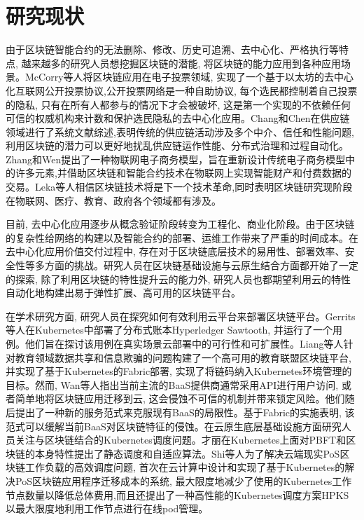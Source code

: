 \section{研究现状}

由于区块链智能合约的无法删除、修改、历史可追溯、去中心化、严格执行等特点, 越来越多的研究人员想挖掘区块链的潜能, 将区块链的能力应用到各种应用场景。McCorry等人\cite{mccorry2017smart}将区块链应用在电子投票领域, 实现了一个基于以太坊的去中心化互联网公开投票协议,公开投票网络是一种自助协议, 每个选民都控制着自己投票的隐私, 只有在所有人都参与的情况下才会被破坏, 这是第一个实现的不依赖任何可信的权威机构来计数和保护选民隐私的去中心化应用。Chang和Chen\cite{chang2020blockchain}在供应链领域进行了系统文献综述,表明传统的供应链活动涉及多个中介、信任和性能问题,利用区块链的潜力可以更好地扰乱供应链运作性能、分布式治理和过程自动化。Zhang和Wen\cite{zhang2017iot}提出了一种物联网电子商务模型，旨在重新设计传统电子商务模型中的许多元素,并借助区块链和智能合约技术在物联网上实现智能财产和付费数据的交易。Leka等人\cite{leka2019systematic}相信区块链技术将是下一个技术革命,同时表明区块链研究现阶段在物联网\cite{christidis2016blockchains}、医疗、教育、政府各个领域都有涉及。

目前, 去中心化应用逐步从概念验证阶段转变为工程化、商业化阶段。由于区块链的复杂性给网络的构建以及智能合约的部署、运维工作带来了严重的时间成本。在去中心化应用价值交付过程中, 存在对于区块链底层技术的易用性、部署效率、安全性等多方面的挑战。研究人员在区块链基础设施与云原生结合方面都开始了一定的探索, 除了利用区块链的特性提升云的能力外\cite{DBLP:journals/comcom/XieZZWH21}\cite{DBLP:conf/smartcloud/SunWY20}\cite{8457813}, 研究人员也都期望利用云的特性自动化地构建出易于弹性扩展、高可用的区块链平台。

在学术研究方面, 研究人员在探究如何有效利用云平台来部署区块链平台。Gerrits等人\cite{DBLP:conf/coins/GerritsKKFV21}在Kubernetes中部署了分布式账本Hyperledger Sawtooth\footnotemark[1], 并运行了一个用例。他们旨在探讨该用例在真实场景云部署中的可行性和可扩展性。Liang等人\cite{liangeduchain}针对教育领域数据共享和信息欺骗的问题构建了一个高可用的教育联盟区块链平台, 并实现了基于Kubernetes的Fabric部署, 实现了将链码纳入Kubernetes环境管理的目标。然而, Wan等人\cite{wan2018novel}指出当前主流的BaaS提供商通常采用API进行用户访问, 或者简单地将区块链应用迁移到云, 这会侵蚀不可信的机制并带来锁定风险。他们随后提出了一种新的服务范式来克服现有BaaS的局限性。基于Fabric的实施表明, 该范式可以缓解当前BaaS对区块链特征的侵蚀。在云原生底层基础设施方面研究人员关注与区块链结合的Kubernetes调度问题。才丽\cite{caili2018}在Kubernetes上面对PBFT和区块链的本身特性提出了静态调度和自适应算法。Shi等人\cite{9582270}为了解决云端现实PoS区块链工作负载的高效调度问题, 首次在云计算中设计和实现了基于Kubernetes的解决PoS区块链应用程序迁移成本的系统, 最大限度地减少了使用的Kubernetes工作节点数量以降低总体费用,而且还提出了一种高性能的Kubernetes调度方案HPKS以最大限度地利用工作节点进行在线pod管理。

